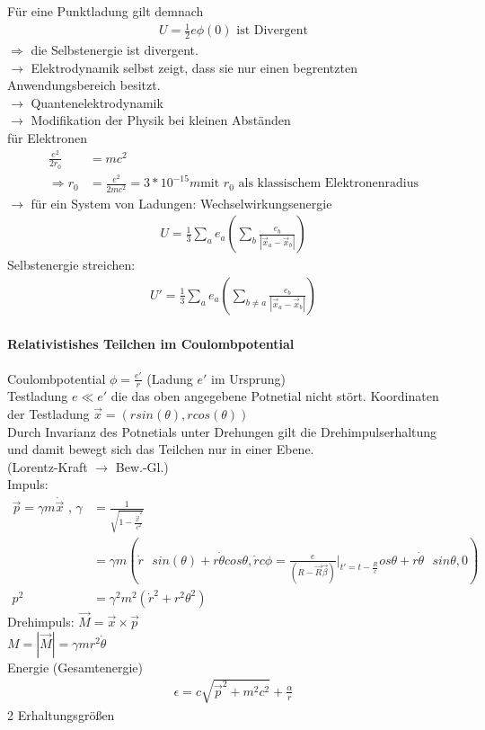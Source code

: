 \documentclass[a4paper]{article}
\begin{document}
Für eine Punktladung gilt demnach
\begin{align}
U=\frac{1}{2}e\phi(0) \text{ ist Divergent}
\end{align}
$\Rightarrow$ die Selbstenergie ist divergent.\\
$\rightarrow$ Elektrodynamik selbst zeigt, dass sie nur einen begrentzten
Anwendungsbereich besitzt.\\
$\rightarrow$ Quantenelektrodynamik\\
$\rightarrow$ Modifikation der Physik bei kleinen Abständen\\
für Elektronen\\
\begin{align}
\frac{e^2}{2r_0}&=mc^2 \\
\Rightarrow r_0&=\frac{e^2}{2mc^2}=3*10^{-15}m \text{
mit }r_0\text{ als klassischem Elektronenradius}
\end{align}
$\rightarrow$ für ein System von Ladungen: Wechselwirkungsenergie
\begin{align}
U=\frac{1}{3}\sum_a e_a \left(\sum_{b} \frac{e_b}{|\vec{x}_a-\vec{x}_b|} \right)
\end{align}
Selbstenergie streichen:
\begin{align}
U'=\frac{1}{3}\sum_a e_a \left(\sum_{b\neq a} \frac{e_b}{|\vec{x}_a-\vec{x}_b|}
\right)
\end{align}
\paragraph{Relativistishes Teilchen im Coulombpotential}
Coulombpotential $\phi=\frac{e'}{r}$ (Ladung $e'$ im Ursprung)\\
Testladung $e \ll e'$ die das oben angegebene Potnetial nicht stört.
Koordinaten der Testladung $\vec{x}=(r sin(\theta), r cos(\theta))$\\
Durch Invarianz des Potnetials unter Drehungen gilt die Drehimpulserhaltung
und damit bewegt sich das Teilchen nur in einer Ebene.\\
(Lorentz-Kraft $\rightarrow$ Bew.-Gl.)\\
Impuls: 
\begin{align}
\vec{p}=\gamma m \dot{\vec{x}} \text{ , }
\gamma&=\frac{1}{\sqrt{1-\frac{\dot{\vec{x}}^2}{c^2}}}\\
&=\gamma m \left(\dot{r}\text{ }sin(\theta)+r \dot{\theta} \text{
}cos\theta,\dot{r} \text{
}c\phi=\frac{e}{(R-\vec{R}\vec{\beta})}|_{t'=t-\frac{R}{c}}os\theta+r\dot{\theta} \text{ }sin\theta,0\right)\\
p^2&=\gamma^2m^2(\dot{r}^2+r^2 \theta^2)
\end{align}
Drehimpuls: $\vec{M}=\vec{x}\times\vec{p}$\\
$M=|\vec{M}|=\gamma mr^2\dot{\theta}$\\
Energie (Gesamtenergie)
\begin{align}
\epsilon=c\sqrt{\vec{p}^2+m^2c^2}+\frac{\alpha}{r}
\end{align}
2 Erhaltungsgrößen
\end{document}
